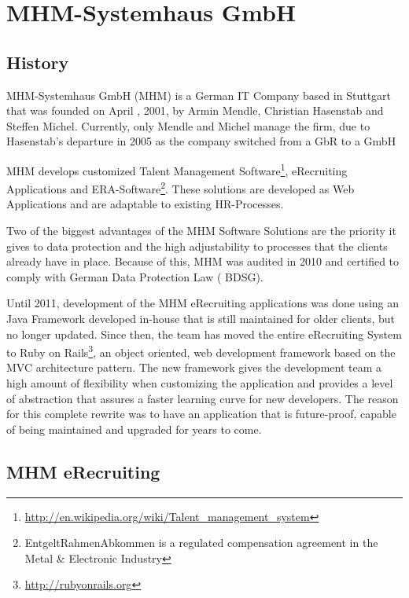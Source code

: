 \chapter{MHM-Systemhaus GmbH}\label{ch:mhm}

\section{History}
MHM-Systemhaus GmbH (MHM) is a German IT Company based in Stuttgart that was founded on April , 2001, by Armin Mendle, Christian Hasenstab and Steffen Michel. Currently, only Mendle and Michel manage the firm, due to Hasenstab's departure in 2005 as the company switched from a GbR to a GmbH

MHM develops customized Talent Management Software\footnote{\url{http://en.wikipedia.org/wiki/Talent_management_system}}, eRecruiting Applications and ERA-Software\footnote{EntgeltRahmenAbkommen is a regulated compensation agreement in the Metal \& Electronic Industry}. These solutions are developed as Web Applications and are adaptable to existing HR-Processes.

Two of the biggest advantages of the MHM Software Solutions are the priority it gives to data protection and the high adjustability to processes that the clients already have in place. Because of this, MHM was audited in 2010 and certified to comply with German Data Protection Law ( BDSG).\cite{michel:2012}

Until 2011, development of the MHM eRecruiting applications was done using an  Java Framework developed in-house that is still maintained for older clients, but no longer updated. Since then, the team has moved the entire eRecruiting System to Ruby on Rails\footnote{\url{http://rubyonrails.org}}, an object oriented, web development framework based on the \ac{MVC} architecture pattern. The new framework gives the development team a high amount of flexibility when customizing the application and provides a level of abstraction that assures a faster learning curve for new developers. The reason for this complete rewrite was to have an application that is future-proof, capable of being maintained and upgraded for years to come.

\section{MHM eRecruiting}

